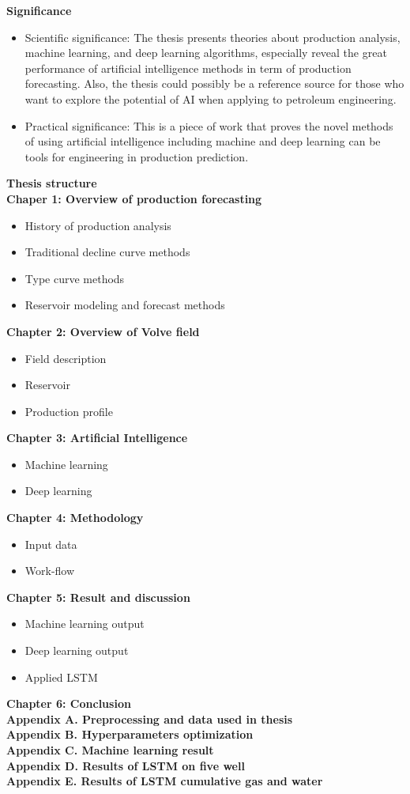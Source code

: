 \documentclass[12pt,a4paper]{report}
\begin{document}
\textbf{Significance}
\begin{itemize}
	\item Scientific significance: The thesis presents theories about production analysis, machine learning, and deep learning algorithms, especially reveal the great performance of artificial intelligence methods in term of production forecasting. Also, the thesis could possibly be a reference source for those who want to explore the potential of AI when applying to petroleum engineering.
	\item Practical significance: This is a piece of work that proves the novel methods of using artificial intelligence including machine and deep learning can be tools for engineering in production prediction.
\end{itemize}
\textbf{Thesis structure}\\
\textbf{Chaper 1: Overview of production forecasting}
\begin{itemize}
	\item History of production analysis
	\item Traditional decline curve methods
	\item Type curve methods
	\item Reservoir modeling and forecast methods
\end{itemize}
\textbf{Chapter 2: Overview of Volve field}
\begin{itemize}
	\item Field description
	\item Reservoir
	\item Production profile
\end{itemize}
\textbf{Chapter 3: Artificial Intelligence}
\begin{itemize}
	\item Machine learning
	\item Deep learning
\end{itemize}
\textbf{Chapter 4: Methodology}
\begin{itemize}
	\item Input data
	\item Work-flow
\end{itemize}
\textbf{Chapter 5: Result and discussion}
\begin{itemize}
	\item Machine learning output
	\item Deep learning output
	\item Applied LSTM
\end{itemize}
\textbf{Chapter 6: Conclusion}\\
\textbf{Appendix A. Preprocessing and data used in thesis}\\
\textbf{Appendix B. Hyperparameters optimization}\\
\textbf{Appendix C. Machine learning result}\\
\textbf{Appendix D. Results of LSTM on five well}\\
\textbf{Appendix E. Results of LSTM cumulative gas and water}
	
\end{document}

